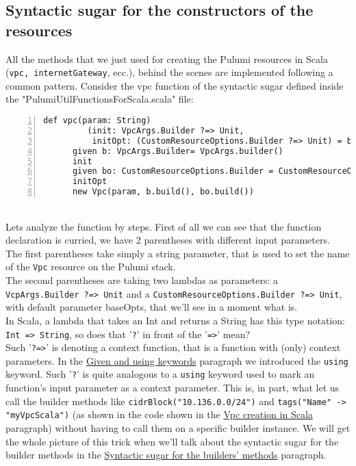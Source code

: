 \subsection{Syntactic sugar for the constructors of the resources}
All the methods that we just used for creating the Pulumi resources in Scala (\texttt{vpc, internetGateway}, ecc.), behind the scenes are implemented following a common pattern.
Consider the vpc function of the syntactic sugar defined inside the "PulumiUtilFunctionsForScala.scala" file:
\begin{lstlisting}[numbers=left, numberstyle=\tiny, numbersep=-5pt, stepnumber=1]
  def vpc(param: String)
         (init: VpcArgs.Builder ?=> Unit,
          initOpt: (CustomResourceOptions.Builder ?=> Unit) = baseOpts): Vpc =
	  given b: VpcArgs.Builder= VpcArgs.builder()
	  init
	  given bo: CustomResourceOptions.Builder = CustomResourceOptions.builder()
	  initOpt
	  new Vpc(param, b.build(), bo.build())
\end{lstlisting}\mbox{}\\
Lets analyze the function by steps.
First of all we can see that the function declaration is curried, we have 2 parentheses with different input parameters.\\
The first parentheses take simply a string parameter, that is used to set the name of the \texttt{Vpc} resource on the Pulumi stack.\\
The second parentheses are taking two lambdas as parameters: a \texttt{VcpArgs.Builder ?=> Unit}  and a \texttt{CustomResourceOptions.Builder ?=> Unit}, with default parameter baseOpts, that we'll see in a moment what is.\\
In Scala, a lambda that takes an Int and returns a String has this type notation: \texttt{Int => String}, so does that '\texttt{?}' in front of the '\texttt{=>}' mean?\\
Such '\texttt{?=>}' is denoting a context function, that is a function with (only) context parameters.
In the \hyperref[par:given-using]{Given and using keywords} paragraph we introduced the \texttt{using} keyword.
Such '\texttt{?}' is quite analogous to a \texttt{using} keyword used to mark an function's input parameter as a context parameter.
This is, in part, what let us call the builder methods like \texttt{cidrBlock("10.136.0.0/24")} and \texttt{tags("Name" -> "myVpcScala")} (as shown in the code shown in the \hyperref[sssec:vpc-creation-scala]{Vpc creation in Scala} paragraph)
without having to call them on a specific builder instance.
We will get the whole picture of this trick when we'll talk about the syntactic sugar for the builder methods in the \hyperref[ssec:syn-sug-builders]{Syntactic sugar for the builders' methods} paragraph.


